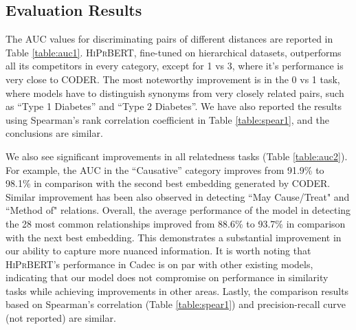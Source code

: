 \documentclass[12pt,a4paper]{cibb}
\begin{document}
\subsection{Evaluation Results}
The AUC values for discriminating pairs of different distances are reported in Table \ref{table:auc1}. \textsc{HiPrBERT}, fine-tuned on hierarchical datasets, outperforms all its competitors in every category, except for 1 vs 3, where it's performance is very close to CODER. The most noteworthy improvement is in the 0 vs 1 task, where models have to distinguish synonyms from very closely related pairs, such as ``Type 1 Diabetes'' and ``Type 2 Diabetes''. We have also reported the results using Spearman's rank correlation coefficient in Table \ref{table:spear1}, and the conclusions are similar.

We also see significant improvements in all relatedness tasks (Table \ref{table:auc2}). For example, the AUC in the ``Causative'' category improves from 91.9\% to 98.1\% in comparison with the second best embedding generated by CODER. Similar improvement has been also observed in detecting ``May Cause/Treat" and ``Method of" relations. Overall, the average performance of the model in detecting the 28 most common relationships improved from 88.6\% to 93.7\% in comparison with the next best embedding. This demonstrates a substantial improvement in our ability to capture more nuanced information. It is worth noting that \textsc{HiPrBERT}'s performance in Cadec is on par with other existing models, indicating that our model does not compromise on performance in similarity tasks while achieving improvements in other areas. Lastly, the comparison results based on Spearman's correlation (Table \ref{table:spear1}) and precision-recall curve (not reported) are similar. 
\end{document}
